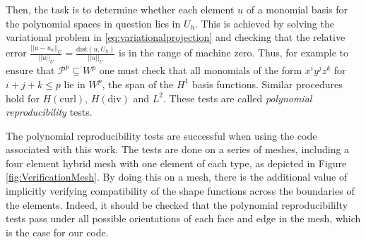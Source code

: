 Then, the task is to determine whether each element $u$ of a monomial basis for the polynomial spaces in question lies in $U_h$.
This is achieved by solving the variational problem in \eqref{eq:variationalprojection} and checking that the relative error $\frac{||u-u_h||_U}{||u||_U}=\frac{\mathrm{dist}(u,U_h)}{||u||_U}$ is in the range of machine zero.
Thus, for example to ensure that $\mathcal{P}^p\subseteq W^p$ one must check that all monomials of the form $x^iy^jz^k$ for $i+j+k\leq p$ lie in $W^p$, the span of the $H^1$ basis functions.
Similar procedures hold for $H(\mathrm{curl})$, $H(\mathrm{div})$ and $L^2$.
These tests are called \textit{polynomial reproducibility} tests.

The polynomial reproducibility tests are successful when using the code associated with this work.
The tests are done on a series of meshes, including a four element hybrid mesh with one element of each type, as depicted in Figure \ref{fig:VerificationMesh}.
By doing this on a mesh, there is the additional value of implicitly verifying compatibility of the shape functions across the boundaries of the elements.
Indeed, it should be checked that the polynomial reproducibililty tests pass under all possible orientations of each face and edge in the mesh, which is the case for our code.

